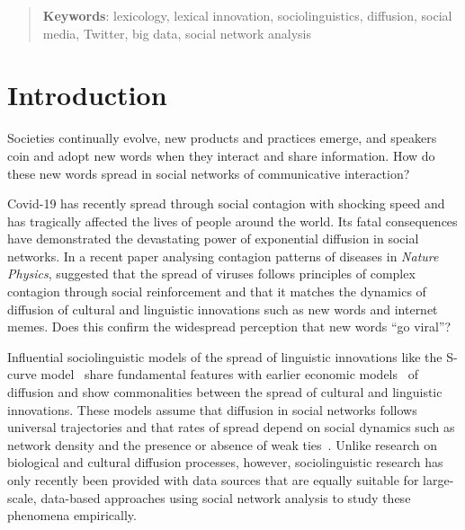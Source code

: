 \documentclass[draft, a4paper, abstract=on]{scrartcl}
\begin{document}
\begin{abstract}
    \vspace{2\baselineskip}

    \textbf{Keywords}: lexicology, lexical innovation, sociolinguistics, diffusion, social media, Twitter, big data, social network analysis

  \end{abstract}


\section{Introduction}

Societies continually evolve, new products and practices emerge, and speakers coin and adopt new words when they interact and share information. How do these new words spread in social networks of communicative interaction?

Covid-19 has recently spread through social contagion with shocking speed and has tragically affected the lives of people around the world. Its fatal consequences have demonstrated the devastating power of exponential diffusion in social networks. In a recent paper analysing contagion patterns of diseases in \emph{Nature Physics}, \textcite{Hebert-Dufresne2020MacroscopicPatterns} suggested that the spread of viruses follows principles of complex contagion through social reinforcement and that it matches the dynamics of diffusion of cultural and linguistic innovations such as new words and internet memes. Does this confirm the widespread perception that new words \enquote{go viral}?

Influential sociolinguistic models of the spread of linguistic innovations like the S-curve model~\parencite{Milroy1992LinguisticVariation} share fundamental features with earlier economic models~\parencite{Rogers1962DiffusionInnovations} of diffusion and show commonalities between the spread of cultural and linguistic innovations. These models assume that diffusion in social networks follows universal trajectories and that rates of spread depend on social dynamics such as network density and the presence or absence of weak ties~\parencite{Granovetter1977StrengthWeak}. Unlike research on biological and cultural diffusion processes, however, sociolinguistic research has only recently been provided with data sources that are equally suitable for large-scale, data-based approaches using social network analysis to study these phenomena empirically.
\end{document}
